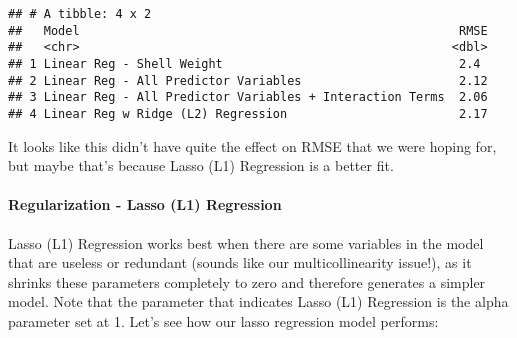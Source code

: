 \documentclass[
]{article}
\begin{document}
\begin{verbatim}
## # A tibble: 4 x 2
##   Model                                                     RMSE
##   <chr>                                                    <dbl>
## 1 Linear Reg - Shell Weight                                 2.4 
## 2 Linear Reg - All Predictor Variables                      2.12
## 3 Linear Reg - All Predictor Variables + Interaction Terms  2.06
## 4 Linear Reg w Ridge (L2) Regression                        2.17
\end{verbatim}

It looks like this didn't have quite the effect on RMSE that we were
hoping for, but maybe that's because Lasso (L1) Regression is a better
fit.

\hypertarget{regularization---lasso-l1-regression}{%
\paragraph{Regularization - Lasso (L1)
Regression}\label{regularization---lasso-l1-regression}}

Lasso (L1) Regression works best when there are some variables in the
model that are useless or redundant (sounds like our multicollinearity
issue!), as it shrinks these parameters completely to zero and therefore
generates a simpler model. Note that the parameter that indicates Lasso
(L1) Regression is the alpha parameter set at 1. Let's see how our lasso
regression model performs:
\end{document}
